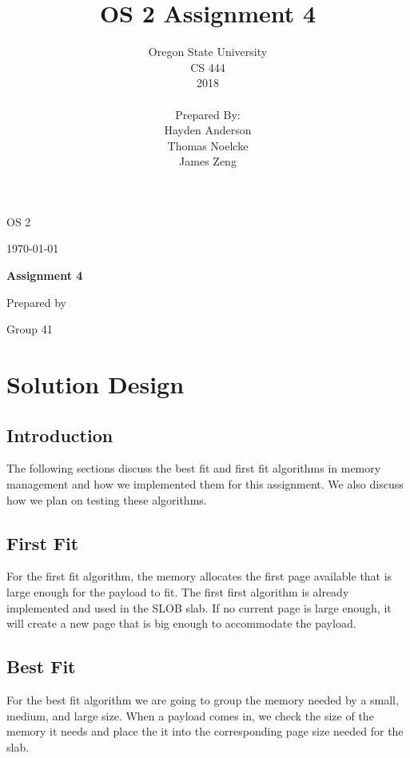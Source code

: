 \documentclass[draftclsnofoot, onecolumn, compsoc, 10pt]{IEEEtran}
\title{OS 2 Assignment 4}
\author{Oregon State University\\CS 444\\2018\\\\Prepared By:\\Hayden
Anderson\\Thomas Noelcke\\James Zeng\\}
\def \CapstoneTeamNumber{		41	}
\def \CapstoneProjectName{		Assignment 4 }
\begin{document}
\begin{titlepage}
    \begin{singlespace}
        \hfill
        \par\vspace{.2in}
        \centering
        \scshape{
            \huge OS 2 \par
            {\large\today}\par
            \vspace{1in}
            \textbf{\Huge\CapstoneProjectName}\par
            \vspace{1in}
            {\large Prepared by }\par
            Group\CapstoneTeamNumber\par
            \vspace{5pt}
            \vspace{20pt}
        }
        \vfill
    \end{singlespace}
    \begin{abstract}
    \end{abstract}
\end{titlepage}
\newpage
{}
\clearpage
\tableofcontents
\pagebreak

\section{Solution Design}
    \subsection{Introduction}
    The following sections discuss the best fit and first fit algorithms in memory management and how we implemented them for this assignment. We also discuss how we plan on testing these algorithms.\\

    \subsection{First Fit}
    For the first fit algorithm, the memory allocates the first page available that is large enough for the payload to fit. The first first algorithm is already implemented and used in the SLOB slab. If no current page is large enough, it will create a new page that is big enough to accommodate the payload.\\

    \subsection{Best Fit}
    For the best fit algorithm we are going to group the memory needed by a small, medium, and large size. When a payload comes in, we check the size of the memory it needs and place the it into the corresponding page size needed for the slab.\\
\end{document}
